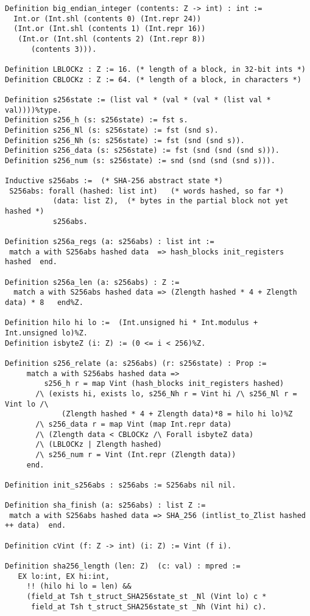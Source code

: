 \documentclass[prodmode,acmtoplas]{acmsmall}
\begin{document}
\begin{lstlisting}
Definition big_endian_integer (contents: Z -> int) : int :=
  Int.or (Int.shl (contents 0) (Int.repr 24))
  (Int.or (Int.shl (contents 1) (Int.repr 16))
   (Int.or (Int.shl (contents 2) (Int.repr 8))
      (contents 3))).

Definition LBLOCKz : Z := 16. (* length of a block, in 32-bit ints *)
Definition CBLOCKz : Z := 64. (* length of a block, in characters *)

Definition s256state := (list val * (val * (val * (list val * val))))%type.
Definition s256_h (s: s256state) := fst s.
Definition s256_Nl (s: s256state) := fst (snd s).
Definition s256_Nh (s: s256state) := fst (snd (snd s)).
Definition s256_data (s: s256state) := fst (snd (snd (snd s))).
Definition s256_num (s: s256state) := snd (snd (snd (snd s))).

Inductive s256abs :=  (* SHA-256 abstract state *)
 S256abs: forall (hashed: list int)   (* words hashed, so far *)
           (data: list Z),  (* bytes in the partial block not yet hashed *)
           s256abs.

Definition s256a_regs (a: s256abs) : list int :=
 match a with S256abs hashed data  => hash_blocks init_registers hashed  end.

Definition s256a_len (a: s256abs) : Z := 
  match a with S256abs hashed data => (Zlength hashed * 4 + Zlength data) * 8   end%Z.

Definition hilo hi lo :=  (Int.unsigned hi * Int.modulus + Int.unsigned lo)%Z.
Definition isbyteZ (i: Z) := (0 <= i < 256)%Z.

Definition s256_relate (a: s256abs) (r: s256state) : Prop :=
     match a with S256abs hashed data =>
         s256_h r = map Vint (hash_blocks init_registers hashed) 
       /\ (exists hi, exists lo, s256_Nh r = Vint hi /\ s256_Nl r = Vint lo /\
             (Zlength hashed * 4 + Zlength data)*8 = hilo hi lo)%Z
       /\ s256_data r = map Vint (map Int.repr data)
       /\ (Zlength data < CBLOCKz /\ Forall isbyteZ data)
       /\ (LBLOCKz | Zlength hashed)
       /\ s256_num r = Vint (Int.repr (Zlength data))
     end.

Definition init_s256abs : s256abs := S256abs nil nil.

Definition sha_finish (a: s256abs) : list Z :=
 match a with S256abs hashed data => SHA_256 (intlist_to_Zlist hashed ++ data)  end.

Definition cVint (f: Z -> int) (i: Z) := Vint (f i).

Definition sha256_length (len: Z)  (c: val) : mpred :=
   EX lo:int, EX hi:int, 
     !! (hilo hi lo = len) &&
     (field_at Tsh t_struct_SHA256state_st _Nl (Vint lo) c *
      field_at Tsh t_struct_SHA256state_st _Nh (Vint hi) c).


\end{lstlisting}
\end{document}
